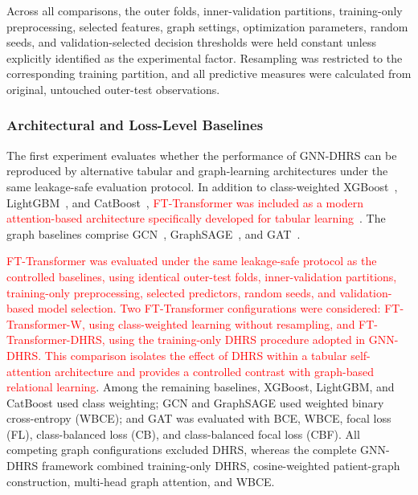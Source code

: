\documentclass[pdflatex,sn-mathphys-num]{sn-jnl}%
\theoremstyle{thmstyleone}%
\theoremstyle{thmstyletwo}%
\theoremstyle{thmstylethree}%
\begin{document}
 {
Across all comparisons, the outer folds, inner-validation partitions,
training-only preprocessing, selected features, graph settings, optimization
parameters, random seeds, and validation-selected decision thresholds were
held constant unless explicitly identified as the experimental factor.
Resampling was restricted to the corresponding training partition, and all
predictive measures were calculated from original, untouched outer-test
observations.
}

\subsubsection{
Architectural and Loss-Level Baselines}
\label{subsubsec:advanced_baselines}


The first experiment evaluates whether the performance of GNN-DHRS can be
reproduced by alternative tabular and graph-learning architectures under the
same leakage-safe evaluation protocol. In addition to class-weighted
XGBoost~\cite{chen2016xgboost}, LightGBM~\cite{ke2017lightgbm}, and
CatBoost~\cite{prokhorenkova2018catboost}, \textcolor{red}{FT-Transformer was included as a
modern attention-based architecture specifically developed for tabular
learning~\cite{gorishniy2021revisiting}}. The graph baselines comprise
GCN~\cite{kipf2017semi}, GraphSAGE~\cite{hamilton2017inductive}, and
GAT~\cite{velivckovic2018graph}.


\textcolor{red}{
FT-Transformer was evaluated under the same leakage-safe protocol as the
controlled baselines, using identical outer-test folds, inner-validation
partitions, training-only preprocessing, selected predictors, random seeds,
and validation-based model selection. Two FT-Transformer configurations were
considered: FT-Transformer-W, using class-weighted learning without
resampling, and FT-Transformer-DHRS, using the training-only DHRS procedure
adopted in GNN-DHRS. This comparison isolates the effect of DHRS within a
tabular self-attention architecture and provides a controlled contrast with
graph-based relational learning}. Among the remaining baselines, XGBoost,
LightGBM, and CatBoost used class weighting; GCN and GraphSAGE used weighted
binary cross-entropy (WBCE); and GAT was evaluated with BCE, WBCE, focal loss
(FL), class-balanced loss (CB), and class-balanced focal loss (CBF). All
competing graph configurations excluded DHRS, whereas the complete GNN-DHRS
framework combined training-only DHRS, cosine-weighted patient-graph
construction, multi-head graph attention, and WBCE.
\end{document}
